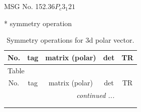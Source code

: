 \documentclass[fleqn,8pt]{jsarticle}
\begin{document}
\setcounter{MaxMatrixCols}{32}

\renewcommand{\tablename}{Table~}
\renewcommand{\figurename}{Figure~}
\begin{center}
\LARGE
MSG No. 152.36\quad$P_{c}3_{1}21$
\end{center}
* symmetry operation
\renewcommand{\arraystretch}{1.3}
\begin{longtable}{ccccc}
\caption{Symmetry operations for 3d polar vector.}
 \\
 \hline \hline
No. & tag & matrix (polar) & det & TR \\ \hline \endfirsthead

\multicolumn{4}{l}{\tablename\ \thetable{}} \\
 \hline \hline
No. & tag & matrix (polar) & det & TR \\ \hline \endhead

 \hline \hline
\multicolumn{4}{r}{\footnotesize\it continued ...} \\ \endfoot

 \hline \hline
\multicolumn{4}{r}{} \\ \endlastfoot


\end{longtable}
\end{document}
